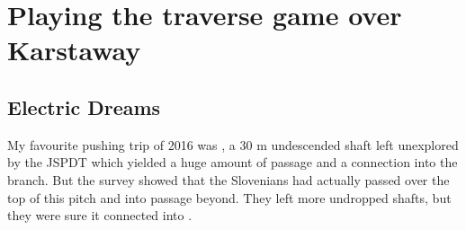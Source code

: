 \section{Playing the traverse game over Karstaway}
    
\subsection{Electric Dreams}

My favourite pushing trip of 2016 was , a 30 m undescended shaft left unexplored by the JSPDT  which yielded a huge amount of passage and a connection into the  branch. But the survey showed that the Slovenians had actually passed over the top of this pitch and into passage beyond. They left more undropped shafts, but they were sure it connected into .


